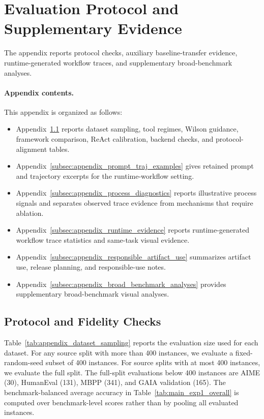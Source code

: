 \section{Evaluation Protocol and Supplementary Evidence}

The appendix reports protocol checks, auxiliary baseline-transfer evidence, runtime-generated workflow traces, and supplementary broad-benchmark analyses.

\paragraph{Appendix contents.}
This appendix is organized as follows:
\begin{itemize}[leftmargin=12pt, nosep]
    \item Appendix~\ref{subsec:appendix_protocol_fidelity} reports dataset sampling, tool regimes, Wilson guidance, framework comparison, ReAct calibration, backend checks, and protocol-alignment tables.
    \item Appendix~\ref{subsec:appendix_prompt_traj_examples} gives retained prompt and trajectory excerpts for the runtime-workflow setting.
    \item Appendix~\ref{subsec:appendix_process_diagnostics} reports illustrative process signals and separates observed trace evidence from mechanisms that require ablation.
    \item Appendix~\ref{subsec:appendix_runtime_evidence} reports runtime-generated workflow trace statistics and same-task visual evidence.
    \item Appendix~\ref{subsec:appendix_responsible_artifact_use} summarizes artifact use, release planning, and responsible-use notes.
    \item Appendix~\ref{subsec:appendix_broad_benchmark_analyses} provides supplementary broad-benchmark visual analyses.
\end{itemize}

\subsection{Protocol and Fidelity Checks}
\label{subsec:appendix_protocol_fidelity}

Table~\ref{tab:appendix_dataset_sampling} reports the evaluation size used for each dataset. For any source split with more than 400 instances, we evaluate a fixed-random-seed subset of 400 instances. For source splits with at most 400 instances, we evaluate the full split. The full-split evaluations below 400 instances are AIME (30), HumanEval (131), MBPP (341), and GAIA validation (165). The benchmark-balanced average accuracy in Table~\ref{tab:main_exp1_overall} is computed over benchmark-level scores rather than by pooling all evaluated instances.

